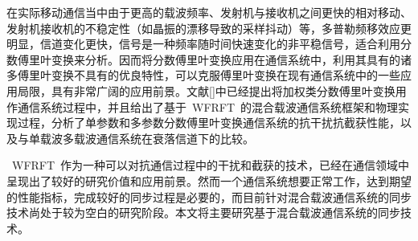 在实际移动通信当中由于更高的载波频率、发射机与接收机之间更快的相对移动、发射机接收机的不稳定性（如晶振的漂移导致的采样抖动）等，多普勒频移效应更明显，信道变化更快，信号是一种频率随时间快速变化的非平稳信号，适合利用分数傅里叶变换来分析。因而将分数傅里叶变换应用在通信系统中，利用其具有的诸多傅里叶变换不具有的优良特性，可以克服傅里叶变换在现有通信系统中的一些应用局限，具有非常广阔的应用前景。文献[]中已经提出将加权类分数傅里叶变换用作通信系统过程中，并且给出了基于~WFRFT~的混合载波通信系统框架和物理实现过程，分析了单参数和多参数分数傅里叶变换通信系统的抗干扰抗截获性能，以及与单载波多载波通信系统在衰落信道下的比较。

~WFRFT~作为一种可以对抗通信过程中的干扰和截获的技术，已经在通信领域中呈现出了较好的研究价值和应用前景。然而一个通信系统想要正常工作，达到期望的性能指标，完成较好的同步过程是必要的，而目前针对混合载波通信系统的同步技术尚处于较为空白的研究阶段。本文将主要研究基于混合载波通信系统的同步技术。

